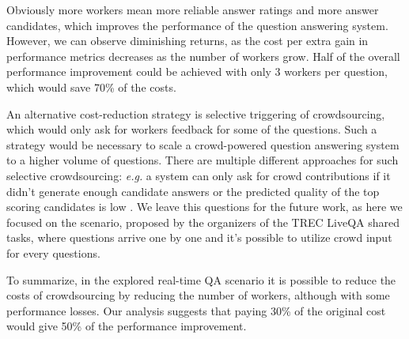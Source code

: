 Obviously more workers mean more reliable answer ratings and more answer candidates, which improves the performance of the question answering system.
However, we can observe diminishing returns, as the cost per extra gain in performance metrics decreases as the number of workers grow.
Half of the overall performance improvement could be achieved with only 3 workers per question, which would save 70\% of the costs.

An alternative cost-reduction strategy is selective triggering of crowdsourcing, which would only ask for workers feedback for some of the questions.
Such a strategy would be necessary to scale a crowd-powered question answering system to a higher volume of questions.
There are multiple different approaches for such selective crowdsourcing: \textit{e.g.} a system can only ask for crowd contributions if it didn't generate enough candidate answers or the predicted quality of the top scoring candidates is low \cite{carmel2010estimating,he2006query}.
We leave this questions for the future work, as here we focused on the scenario, proposed by the organizers of the TREC LiveQA shared tasks, where questions arrive one by one and it's possible to utilize crowd input for every questions.

To summarize, in the explored real-time QA scenario it is possible to reduce the costs of crowdsourcing by reducing the number of workers, although with some performance losses.
Our analysis suggests that paying 30\% of the original cost would give 50\% of the performance improvement.

